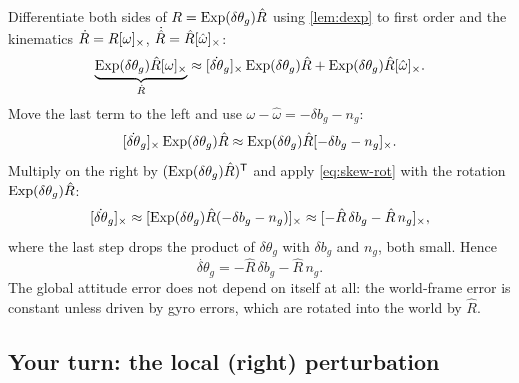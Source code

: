 \begin{example}
\label{ex:global-attitude}
Differentiate both sides of $R = \operatorname{Exp}(\delta\theta_g)\hat R$ using \cref{lem:dexp} to first order and the kinematics
$\dot R = R[\omega]_{\times}$, $\dot{\hat R} = \hat R[\hat\omega]_{\times}$:
\begin{equation*}
  \underbrace{\operatorname{Exp}(\delta\theta_g)\hat R[\omega]_{\times}}_{\dot R}
  \approx [\dot{\delta\theta}_g]_{\times}\operatorname{Exp}(\delta\theta_g)\hat R + \operatorname{Exp}(\delta\theta_g)\hat R[\hat\omega]_{\times}.
\end{equation*}
Move the last term to the left and use $\omega - \hat\omega = -\delta b_g - n_g$:
\begin{equation*}
  [\dot{\delta\theta}_g]_{\times}\operatorname{Exp}(\delta\theta_g)\hat R \approx \operatorname{Exp}(\delta\theta_g)\hat R[-\delta b_g - n_g]_{\times}.
\end{equation*}
Multiply on the right by $(\operatorname{Exp}(\delta\theta_g)\hat R)^{\mathsf{T}}$ and apply \eqref{eq:skew-rot} with the rotation $\operatorname{Exp}(\delta\theta_g)\hat R$:
\begin{equation*}
  [\dot{\delta\theta}_g]_{\times} \approx [\operatorname{Exp}(\delta\theta_g)\hat R(-\delta b_g - n_g)]_{\times} \approx [-\hat R\,\delta b_g - \hat R\, n_g]_{\times},
\end{equation*}
where the last step drops the product of $\delta\theta_g$ with $\delta b_g$ and $n_g$, both small. Hence
\begin{equation}
  \dot{\delta\theta}_g = -\hat R\,\delta b_g - \hat R\,n_g .
\end{equation}
The global attitude error does not depend on itself at all: the world-frame error is constant unless driven by
gyro errors, which are rotated into the world by $\hat R$.
\end{example}

\subsection{Your turn: the local (right) perturbation}

